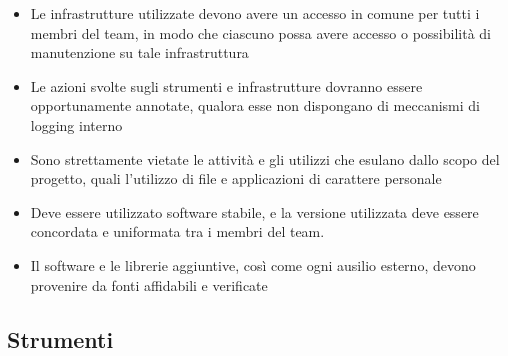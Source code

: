 	\begin{itemize}
		\item Le infrastrutture utilizzate devono avere un accesso in comune per tutti i membri del team, in modo che ciascuno possa avere accesso o possibilità di manutenzione su tale infrastruttura
		\item Le azioni svolte sugli strumenti e infrastrutture dovranno essere opportunamente annotate, qualora esse non dispongano di meccanismi di logging interno
		\item Sono strettamente vietate le attività e gli utilizzi che esulano dallo scopo del progetto, quali l'utilizzo di file e applicazioni di carattere personale
		\item Deve essere utilizzato software stabile, e la versione utilizzata deve essere concordata e uniformata tra i membri del team.
		\item Il software e le librerie aggiuntive, così come ogni ausilio esterno, devono provenire da fonti affidabili e verificate
	\end{itemize}
	
	\newpage
	\subsection{Strumenti}

